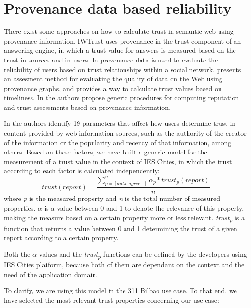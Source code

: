 \section{Provenance data based reliability}
\label{sec:provenance}

There exist some approaches on how to calculate trust in semantic web using provenance information. IWTrust \cite{zaihrayeu2005iwtrust} uses provenance in the trust component of an answering engine, in which a trust value for answers is measured based on the trust in sources and in users. In \cite{golbeck2006combining} provenance data is used to evaluate the reliability of users based on trust relationships within a social network. \cite{Hartig09usingweb} presents an assesment method for evaluating the quality of data on the Web using provenance graphs, and provides a way to calculate trust values based on timeliness. In \cite{CeolinGHNF12} the authors propose generic procedures for computing reputation and trust assessments based on provenance information. 

In \cite{gil2007towards} the authors identify 19 parameters that affect how users determine trust in content provided by web information sources, such as the authority of the creator of the information or the popularity and recency of that information, among others. Based on these factors, we have built a generic model for the measurement of a trust value in the context of IES Cities, in which the trust according to each factor is calculated independently:
%
\begin{equation}
trust(report) = \frac{\sum_{p=[auth, agree...]}^{n} \alpha_p * trust_p(report)}{n}
\end{equation}
%
where \textit{p} is the measured property and \textit{n} is the total number of measured properties. {$\alpha$} is a value between 0 and 1 to denote the relevance of this property, making the measure based on a certain property more or less relevant. \textit{trust\textsubscript{p}} is a function that returns a value between 0 and 1 determining the trust of a given report according to a certain property.

Both the $\alpha$ values and the \textit{trust\textsubscript{p}} functions can be defined by the developers using IES Cities platform, because both of them are dependant on the context and the need of the application domain.

To clarify, we are using this model in the 311 Bilbao use case. To that end, we have selected the most relevant trust-properties concerning our use case:

